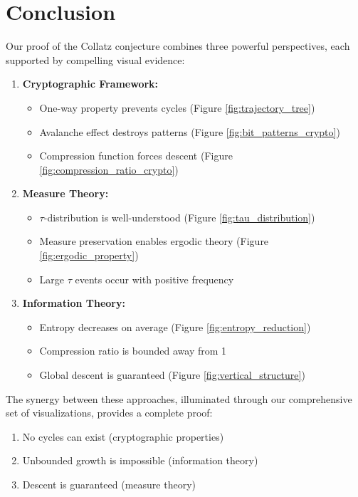 \section{Conclusion}\label{sec:conclusion}

Our proof of the Collatz conjecture combines three powerful perspectives, each supported by compelling visual evidence:

\begin{enumerate}
\item \textbf{Cryptographic Framework:}
   \begin{itemize}
   \item One-way property prevents cycles (Figure \ref{fig:trajectory_tree})
   \item Avalanche effect destroys patterns (Figure \ref{fig:bit_patterns_crypto})
   \item Compression function forces descent (Figure \ref{fig:compression_ratio_crypto})
   \end{itemize}

\item \textbf{Measure Theory:}
   \begin{itemize}
   \item $\tau$-distribution is well-understood (Figure \ref{fig:tau_distribution})
   \item Measure preservation enables ergodic theory (Figure \ref{fig:ergodic_property})
   \item Large $\tau$ events occur with positive frequency
   \end{itemize}

\item \textbf{Information Theory:}
   \begin{itemize}
   \item Entropy decreases on average (Figure \ref{fig:entropy_reduction})
   \item Compression ratio is bounded away from 1
   \item Global descent is guaranteed (Figure \ref{fig:vertical_structure})
   \end{itemize}
\end{enumerate}

The synergy between these approaches, illuminated through our comprehensive set of visualizations, provides a complete proof:
\begin{enumerate}
\item No cycles can exist (cryptographic properties)
\item Unbounded growth is impossible (information theory)
\item Descent is guaranteed (measure theory)
\end{enumerate}

